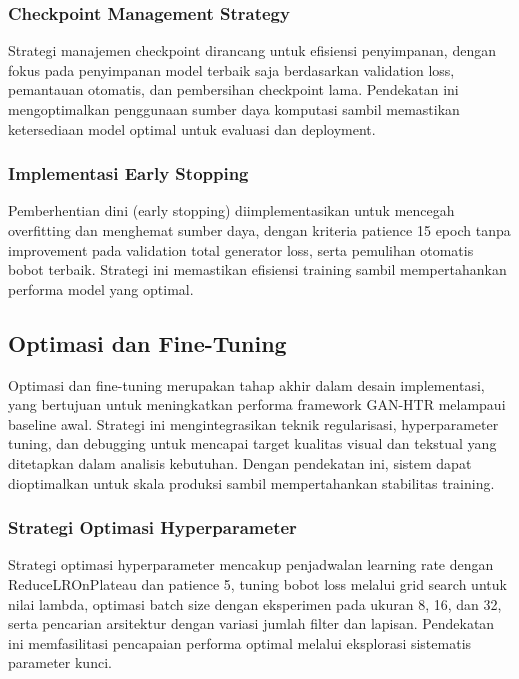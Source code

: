 \documentclass[12pt,a4paper]{article}
\begin{document}
\subsubsection{Checkpoint Management Strategy}
\label{subsubsec:checkpoint-management}

Strategi manajemen checkpoint dirancang untuk efisiensi penyimpanan, dengan fokus pada penyimpanan model terbaik saja berdasarkan validation loss, pemantauan otomatis, dan pembersihan checkpoint lama. Pendekatan ini mengoptimalkan penggunaan sumber daya komputasi sambil memastikan ketersediaan model optimal untuk evaluasi dan deployment.

\subsubsection{Implementasi Early Stopping }
\label{subsubsec:early-stopping}

Pemberhentian dini (early stopping) diimplementasikan untuk mencegah overfitting dan menghemat sumber daya, dengan kriteria patience 15 epoch tanpa improvement pada validation total generator loss, serta pemulihan otomatis bobot terbaik. Strategi ini memastikan efisiensi training sambil mempertahankan performa model yang optimal.

\subsection{Optimasi dan Fine-Tuning}
\label{subsec:optimasi-finetuning}

Optimasi dan fine-tuning merupakan tahap akhir dalam desain implementasi, yang bertujuan untuk meningkatkan performa framework GAN-HTR melampaui baseline awal. Strategi ini mengintegrasikan teknik regularisasi, hyperparameter tuning, dan debugging untuk mencapai target kualitas visual dan tekstual yang ditetapkan dalam analisis kebutuhan. Dengan pendekatan ini, sistem dapat dioptimalkan untuk skala produksi sambil mempertahankan stabilitas training.

\subsubsection{Strategi Optimasi Hyperparameter}
\label{subsubsec:hyperparameter-optimasi}

Strategi optimasi hyperparameter mencakup penjadwalan learning rate dengan ReduceLROnPlateau dan patience 5, tuning bobot loss melalui grid search untuk nilai lambda, optimasi batch size dengan eksperimen pada ukuran 8, 16, dan 32, serta pencarian arsitektur dengan variasi jumlah filter dan lapisan. Pendekatan ini memfasilitasi pencapaian performa optimal melalui eksplorasi sistematis parameter kunci.
\end{document}
